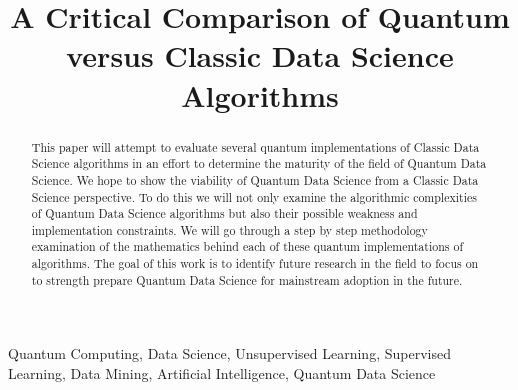 \documentclass[conference]{IEEEtran}
\begin{document}
\title{A Critical Comparison of Quantum versus Classic Data Science Algorithms\\


}

\author{


}

\maketitle

\begin{abstract}
This paper will attempt to evaluate several quantum implementations of Classic Data Science algorithms in an effort to determine the maturity of the field of Quantum Data Science. We hope to show the viability of Quantum Data Science from a Classic Data Science perspective. To do this we will not only examine the algorithmic complexities of Quantum Data Science algorithms but also their possible weakness and implementation constraints. We will go through a step by step methodology examination of the mathematics behind each of these quantum implementations of algorithms. The goal of this work is to identify future research in the field to focus on to strength prepare Quantum Data Science for mainstream adoption in the future. 
\end{abstract}

\begin{IEEEkeywords}
Quantum Computing, Data Science, Unsupervised Learning, Supervised Learning, Data Mining, Artificial Intelligence, Quantum Data Science 
\end{IEEEkeywords}
\end{document}

